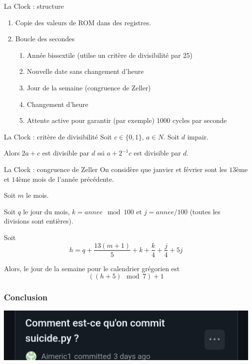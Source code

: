 \documentclass[12pt]{beamer}
\begin{document}
\begin{frame}{La Clock : structure}
    \begin{enumerate}
        \item Copie des valeurs de ROM dans des registres.
        \item Boucle des secondes
        \begin{enumerate}
            \item Année bissextile (utilse un critère de divisibilité par 25)
            \item Nouvelle date sans changement d'heure
            \item Jour de la semaine (congruence de Zeller)
            \item Changement d'heure
            \item Attente active pour garantir (par exemple) 1000 cycles par seconde
        \end{enumerate}
    \end{enumerate}
\end{frame}

\begin{frame}{La Clock : critère de divisibilité}
    Soit $c \in \{0, 1\}$, $a\in N$. Soit $d$ impair.

    Alors $2a+c$ est divisible par $d$ ssi $a+2^{-1}c$ est divisible par $d$.
\end{frame}


\begin{frame}{La Clock : congruence de Zeller}
On considère que janvier et février sont les $13$ème et $14$ème mois de l'année précédente. 

Soit $m$ le mois. 

Soit $q$ le jour du mois, $k = annee \mod 100$ et $j = annee/100$ (toutes les divisions sont entières).

Soit $$h = q + \frac{13(m+1)}{5}+k+\frac{k}{4}+\frac{j}{4}+5j$$

Alors, le jour de la semaine pour le calendrier grégorien est $$((h+5)\mod 7 )+1$$
\end{frame}

\begin{frame}
\frametitle{Conclusion}
	\includegraphics[scale=0.2]{conclusion.jpg}
\end{frame}
\end{document}

